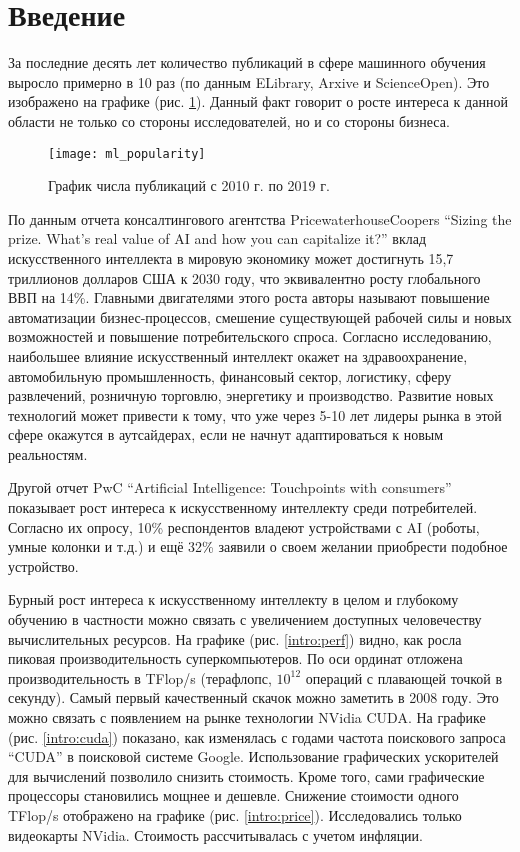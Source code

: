 \clearpage
\section{Введение}
За последние десять лет количество публикаций в сфере машинного обучения выросло примерно в 10 раз (по данным ELibrary, Arxive и ScienceOpen). Это изображено на графике (рис. \ref{intro:lit}). Данный факт говорит о росте интереса к данной области не только со стороны исследователей, но и со стороны бизнеса.
\par
\begin{figure}[h]
	\centering
	\texttt{[image: ml\_popularity]}
	\caption{График числа публикаций с 2010 г. по 2019 г.}
	\label{intro:lit}
\end{figure}
\par
По данным отчета консалтингового агентства PricewaterhouseCoopers “Sizing the prize. What’s real value of AI and how you can capitalize it?” вклад искусственного интеллекта в мировую экономику может достигнуть 15,7 триллионов долларов США к 2030 году, что эквивалентно росту глобального ВВП на 14\%. Главными двигателями этого роста авторы называют повышение автоматизации бизнес-процессов, смешение существующей рабочей силы и новых возможностей и повышение потребительского спроса. Согласно исследованию, наибольшее влияние искусственный интеллект окажет на здравоохранение, автомобильную промышленность, финансовый сектор, логистику, сферу развлечений, розничную торговлю, энергетику и производство. Развитие новых технологий может привести к тому, что уже через 5-10 лет лидеры рынка в этой сфере окажутся в аутсайдерах, если не начнут адаптироваться к новым реальностям.
\par
Другой отчет PwC “Artificial Intelligence: Touchpoints with consumers” показывает рост интереса к искусственному интеллекту среди потребителей. Согласно их опросу, 10\% респондентов владеют устройствами с AI (роботы, умные колонки и т.д.) и ещё 32\% заявили о своем желании приобрести подобное устройство.
\par
Бурный рост интереса к искусственному интеллекту в целом и глубокому обучению в частности можно связать с увеличением доступных человечеству вычислительных ресурсов. На графике (рис. \ref{intro:perf}) видно, как росла пиковая производительность суперкомпьютеров. По оси ординат отложена производительность в TFlop/s (терафлопс, $10^12$ операций с плавающей точкой в секунду). Самый первый качественный скачок можно заметить в 2008 году. Это можно связать с появлением на рынке технологии NVidia CUDA. На графике (рис. \ref{intro:cuda}) показано, как изменялась с годами частота поискового запроса “CUDA” в поисковой системе Google. Использование графических ускорителей для вычислений позволило снизить стоимость. Кроме того, сами графические процессоры становились мощнее и дешевле. Снижение стоимости одного TFlop/s отображено на графике (рис. \ref{intro:price}). Исследовались только видеокарты NVidia. Стоимость рассчитывалась с учетом инфляции.
